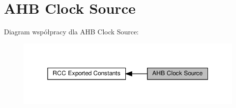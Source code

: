 \hypertarget{group___r_c_c___a_h_b___clock___source}{}\section{A\+HB Clock Source}
\label{group___r_c_c___a_h_b___clock___source}
Diagram współpracy dla A\+HB Clock Source\+:\nopagebreak
\begin{figure}[H]
\begin{center}
\leavevmode
\includegraphics[width=345pt]{group___r_c_c___a_h_b___clock___source}
\end{center}
\end{figure}
